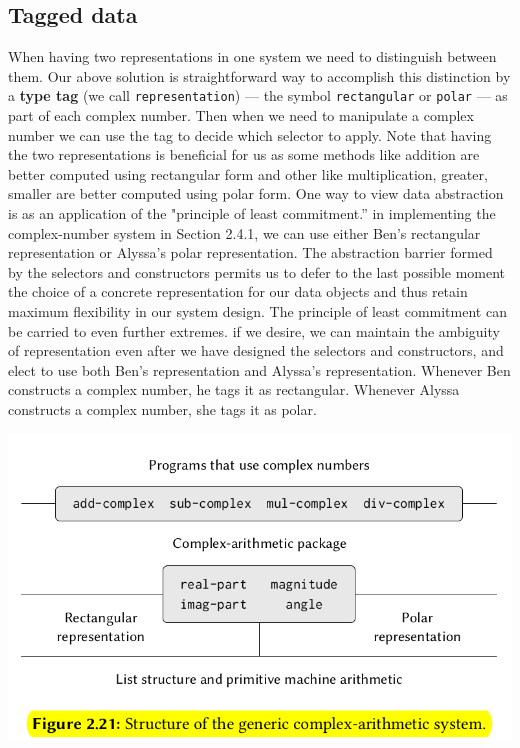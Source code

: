 \documentclass[a4paper,twoside]{article}
\numberwithin{equation}{section}
\begin{document}
\subsection{Tagged data}
When having two representations in one system we need to distinguish between them. Our above solution
is straightforward way to accomplish this distinction by a \textbf{type tag} (we call
\texttt{representation}) — the symbol \texttt{rectangular} or \texttt{polar} — as part of
each complex number. Then when we need to manipulate a complex number we can use the tag to decide
which selector to apply. Note that having the two representations
is beneficial for us as some methods like addition are better computed using rectangular form
and other like multiplication, greater, smaller are better computed using polar form.
One way to view data abstraction is as an application of the "principle of least commitment.”
in implementing the complex-number system in Section 2.4.1, we can use either Ben's rectangular
representation or Alyssa's polar representation. The abstraction barrier formed by the selectors
and constructors permits us to defer to the last possible moment the choice of a concrete
representation for our data objects and thus retain maximum flexibility in our system design.
The principle of least commitment can be carried to even further extremes. if we desire,
we can maintain the ambiguity of representation even after we have designed the selectors and
constructors, and elect to use both Ben's representation and Alyssa's representation.
Whenever Ben constructs a complex number, he tags it as rectangular. Whenever
Alyssa constructs a complex number, she tags it as polar.
\begin{center}
    \includegraphics[scale=0.12]{assets/complex_number_structure.png}
\end{center}
\end{document}
